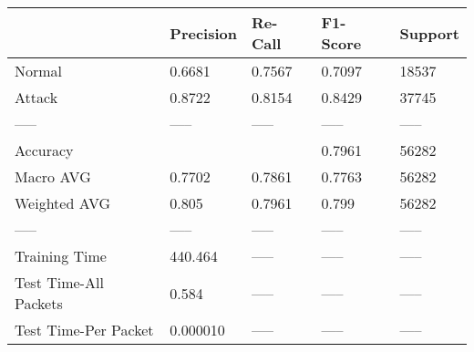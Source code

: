 \begin{tabular}{lllll}
\toprule
{} & Precision & Re-Call & F1-Score & Support \\
\midrule
Normal                &    0.6681 &  0.7567 &   0.7097 &   18537 \\
Attack                &    0.8722 &  0.8154 &   0.8429 &   37745 \\
-----                 &     ----- &   ----- &    ----- &   ----- \\
Accuracy              &           &         &   0.7961 &   56282 \\
Macro AVG             &    0.7702 &  0.7861 &   0.7763 &   56282 \\
Weighted AVG          &     0.805 &  0.7961 &    0.799 &   56282 \\
-----                 &     ----- &   ----- &    ----- &   ----- \\
Training Time         &   440.464 &   ----- &    ----- &   ----- \\
Test Time-All Packets &     0.584 &   ----- &    ----- &   ----- \\
Test Time-Per Packet  &  0.000010 &   ----- &    ----- &   ----- \\
\bottomrule
\end{tabular}
